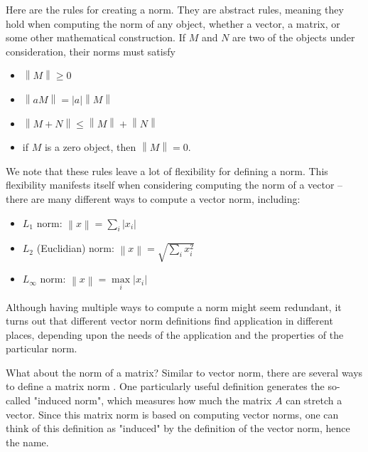 \documentclass[onefignum,onetabnum]{siamart190516}
\begin{document}
Here are the rules for creating a norm.  They are abstract rules, meaning
they hold when computing the norm of any object, whether a vector, a matrix, or
some other mathematical construction.
If $M$ and $N$ are two of the objects under consideration, their 
norms must satisfy
\begin{itemize}
	\item $\left\lVert{M}\right\rVert \geq 0$
	
	\item $\left\lVert{a M}\right\rVert = \left\lvert{a}\right\rvert\left\lVert{M}\right\rVert$
	
	\item $\left\lVert{M+N}\right\rVert \leq \left\lVert{M}\right\rVert + \left\lVert{N}\right\rVert$
	
	\item if $M$ is a zero object, then $\left\lVert{M}\right\rVert = 0$.
\end{itemize}
We note that these rules leave a lot of flexibility for defining a
norm.  This flexibility manifests itself when considering computing
the norm of a vector -- there are many different ways to compute a
vector norm, including:
\begin{itemize}
	\item $L_1$ norm: $\left\lVert{x}\right\rVert = \sum_i \lvert x_i\rvert$
	
	\item $L_2$ (Euclidian) norm: $\left\lVert{x}\right\rVert = \sqrt{\sum_i x_i^2}$
	
	\item $L_\infty$ norm: $\left\lVert{x}\right\rVert = \max\limits_{i} \lvert x_i \rvert$
\end{itemize}

Although having multiple ways to compute a norm might seem redundant,
it turns out that different vector norm definitions find application
in different places, depending upon the needs of the application and the properties
of the particular norm. 

What about the norm of a matrix?  Similar to vector norm,
there are several ways to define a
matrix norm \cite{Weisstein_MatrixNorm}.  One particularly useful definition generates the
so-called "induced norm", which measures how much the matrix $A$ can
stretch a vector.  Since this matrix norm is based on computing vector
norms, one can think of this definition as  "induced" by the
definition of the vector norm, hence the name.
\end{document}
